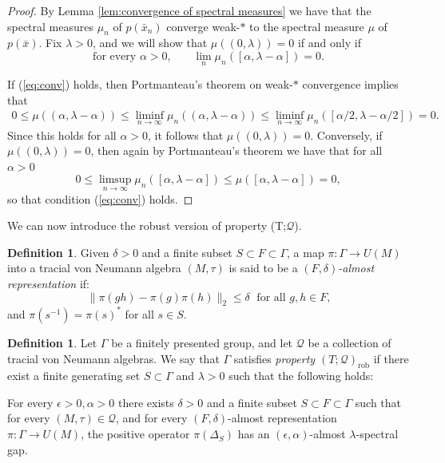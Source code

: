 \documentclass[11pt]{amsart}
\DeclareMathOperator{\op}{op}
\newcommand{\cH}{{\mathcal{H}}}
\theoremstyle{definition}
\newtheorem{definition}[theorem]{Definition}
\theoremstyle{remark}
\theoremstyle{definition}
\begin{document}
\begin{proof}
    By Lemma \ref{lem:convergence of spectral measures} we have that the spectral measures $\mu_n$ of $p(\bar x_n)$ converge weak-$*$ to  the spectral measure $\mu$ of $p(\bar x)$.
    Fix $\lambda > 0$, and we will show that $\mu((0,\lambda))=0$  if and only if
    \begin{equation}\label{eq:conv}
        \text{for every $\alpha > 0$,} \qquad \lim_n \mu_n([\alpha, \lambda - \alpha])  = 0.
    \end{equation}

    If  (\ref{eq:conv}) holds, then Portmanteau's theorem on weak-$*$ convergence implies that
    \begin{align*}
        0\leq \mu((\alpha,\lambda-\alpha)) \leq  \liminf_{n\to \infty} \mu_n((\alpha, \lambda-\alpha))
        \leq \liminf_{n\to\infty} \mu_n([\alpha/2, \lambda-\alpha/2]) = 0.
    \end{align*}
    Since this holds for all $\alpha>0$, it follows that $\mu((0,\lambda))=0$.
    Conversely, if $\mu((0,\lambda))=0$, then again by Portmanteau's theorem we have that for all $\alpha >0$  $$0 \leq \limsup_{n\to \infty} \mu_n([\alpha, \lambda - \alpha]) \leq \mu([\alpha, \lambda - \alpha]) = 0,$$ so that condition (\ref{eq:conv}) holds.
\end{proof}

We can now introduce the robust version of property (T;$\mathcal Q$).

\begin{definition}
Given $\delta > 0$ and a finite subset $S\subset F \subset \Gamma$, a map $\pi: \Gamma \to U(M)$ into  a tracial von Neumann algebra $(M,\tau)$ is said to be a \emph{$(F, \delta)$-almost representation} if:
$$ \| \pi(gh) - \pi(g) \pi(h) \|_{2} \leq \delta\; \text{ for all $g,h \in F$,}$$
and $\pi(s^{-1}) = \pi(s)^{*}$ for all $s \in S$.
\end{definition}

\begin{definition}\label{def:robust}
    Let $\Gamma$ be a finitely presented group, and let \(\mathcal{Q}\) be a collection of tracial von Neumann algebras.
    We say that \(\Gamma \) satisfies \emph{property \((T;\mathcal{Q})_\mathrm{rob}\)} if there exist a finite generating set \(S \subset \Gamma \) and \(\lambda > 0\) such that the following holds:

    For every \(\epsilon > 0, \alpha>0\) there exists \(\delta > 0\) and a finite subset $S \subset F \subset\Gamma$ such that for every \((M,\tau) \in \mathcal{Q}\), and for every \((F,\delta)\)-almost representation \(\pi \colon \Gamma  \to U(M)\), the positive operator \(\pi(\Delta_S) \) has an \((\epsilon, \alpha)\)-almost \(\lambda\)-spectral gap.

\end{definition}
\end{document}
